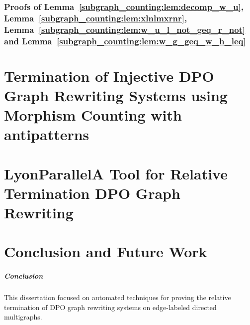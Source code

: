 \documentclass{report}
\begin{document}
\subsection*{Proofs of Lemma~\ref{subgraph_counting:lem:decomp_w_u}, Lemma~\ref{subgraph_counting:lem:xlnlmxrnr}, Lemma~\ref{subgraph_counting:lem:w_u_l_not_geq_r_not} and Lemma~\ref{subgraph_counting:lem:w_g_geq_w_h_leq}}
\label{subgraph_counting:sec:appendix:a}




\chapter{Termination of Injective DPO Graph Rewriting
Systems using Morphism Counting with antipatterns}
\label{chap:antipattern}
 


 
\chapter{LyonParallel\textemdash A Tool for Relative Termination DPO Graph Rewriting} 
\label{chap:lyonparallel}

\chapter{Conclusion and Future Work}
\paragraph{Conclusion}
This dissertation focused on automated techniques for proving the relative termination of DPO graph rewriting systems on edge-labeled directed multigraphs.
\end{document}
